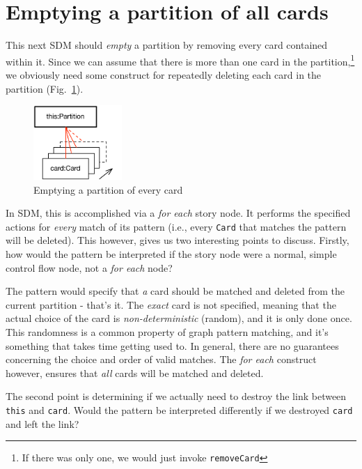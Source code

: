 \newpage
\hypertarget{sec:emptyPartition}{}
\section{Emptying a partition of all cards}
\genHeader

This next SDM should \emph{empty} a partition by removing every card contained within it. Since we can assume that there is more than one card in the
partition,\footnote{If there was only one, we would just invoke \texttt{removeCard}} we obviously need some construct for repeatedly deleting each card in the
partition (Fig.~\ref{fig:goal_empty}). 

\begin{figure}[htbp]
	\centering
  \includegraphics[width=0.3\textwidth]{goal_partitionEmpty.pdf}
	\caption{Emptying a partition of every card}
	\label{fig:goal_empty}
\end{figure}
\FloatBarrier

In SDM, this  is accomplished via a \emph{for each} story node. It performs the specified actions for \emph{every} match of its
pattern (i.e., every \texttt{Card} that matches the pattern will be deleted). This however, gives us two interesting points to discuss.
Firstly, how would the pattern be interpreted if the story node were a normal, simple control flow node, not a \emph{for each} node?

The pattern would specify that \emph{a} card should be matched and deleted from the current partition - that's it. The \emph{exact} card is not specified,
meaning that the actual choice of the card is \emph{non-deterministic} (random), and it is only done once. This randomness is a common property of graph pattern
matching, and it's something that takes time getting used to.  In general, there are no guarantees concerning the choice and order of valid matches. The
\emph{for each} construct however, ensures that \emph{all} cards will be matched and deleted.

The second point is determining if we actually need to destroy the link between \texttt{this} and \texttt{card}. Would the pattern be interpreted differently if
 we destroyed \texttt{card} and left the link?

